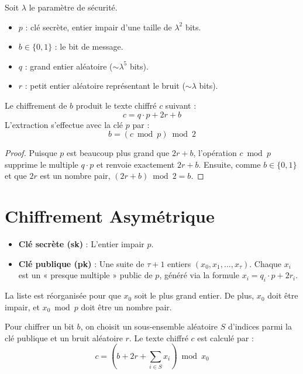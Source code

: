 \begin{definition}[Paramètres]
Soit $\lambda$ le paramètre de sécurité.
\begin{itemize}
    \item $p$ : clé secrète, entier impair d'une taille de $\lambda^2$ bits.
    \item $b \in \{0, 1\}$ : le bit de message.
    \item $q$ : grand entier aléatoire ($\sim\lambda^5$ bits).
    \item $r$ : petit entier aléatoire représentant le bruit ($\sim\lambda$ bits).
\end{itemize}
\end{definition}

\begin{proposition}
Le chiffrement de $b$ produit le texte chiffré $c$ suivant :
\[ c = q \cdot p + 2r + b \] 
L'extraction s'effectue avec la clé $p$ par :
\[ b = (c \bmod p) \bmod 2 \] 
\end{proposition}

\begin{proof}
Puisque $p$ est beaucoup plus grand que $2r + b$, l'opération $c \bmod p$ supprime le multiple $q \cdot p$ et renvoie exactement $2r + b$. Ensuite, comme $b \in \{0, 1\}$ et que $2r$ est un nombre pair, $(2r + b) \bmod 2 = b$.
\end{proof}

\section{Chiffrement Asymétrique}

\begin{definition}
\begin{itemize}
    \item \textbf{Clé secrète (sk)} : L'entier impair $p$.
    \item \textbf{Clé publique (pk)} : Une suite de $\tau + 1$ entiers $( x_0, x_1, \dots, x_\tau )$. Chaque $x_i$ est un « presque multiple » public de $p$, généré via la formule $x_i = q_i \cdot p + 2r_i$.
\end{itemize}
La liste est réorganisée pour que $x_0$ soit le plus grand entier. De plus, $x_0$ doit être impair, et $x_0 \bmod p$ doit être un nombre pair.
\end{definition}

\begin{proposition}[Chiffrement]
Pour chiffrer un bit $b$, on choisit un sous-ensemble aléatoire $S$ d'indices parmi la clé publique et un bruit aléatoire $r$. Le texte chiffré $c$ est calculé par :
\[ c = \left( b + 2r + \sum_{i \in S} x_i \right) \bmod x_0 \]
\end{proposition}

